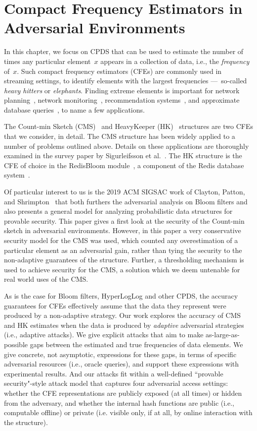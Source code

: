 \chapter{Compact Frequency Estimators in Adversarial Environments}\label{chap:cfe}

In this chapter, we focus on CPDS that can be used to estimate the number of times any particular element~$x$ appears in a collection of data, i.e., the \emph{frequency} of~$x$. Such compact frequency estimators (CFEs) are commonly used in streaming settings, to identify elements with the largest frequencies ---~so-called \emph{heavy hitters} or \emph{elephants}.  Finding extreme elements is important for network planning~\cite{feldmann00}, network monitoring~\cite{lakhina04}, recommendation systems~\cite{melis2015efficient}, and approximate database queries~\cite{redisbloom}, to name a few applications.  

The Count-min Sketch (CMS)~\cite{cormode2005improved} and HeavyKeeper (HK)~\cite{yang2019heavykeeper} structures are two CFEs that we consider, in detail.
The CMS structure has been widely applied to a number of problems outlined above. Details on these applications are thoroughly examined in the survey paper by Sigurleifsson et al.~\cite{sigurleifsson2019overview}. The HK structure is the CFE of choice in the RedisBloom module~\cite{redisbloom}, a component of the Redis database system~\cite{redis}.  

Of particular interest to us is the 2019 ACM SIGSAC work of Clayton, Patton, and Shrimpton~\cite{clayton2019} that both furthers the adversarial analysis on Bloom filters and also presents a general model for analyzing probabilistic data structures for provable security. This paper gives a first look at the security of the Count-min sketch in adversarial environments. However, in this paper a very conservative security model for the CMS was used, which counted any overestimation of a particular element as an adversarial gain, rather than tying the security to the non-adaptive guarantees of the structure. Further, a thresholding mechanism is used to achieve security for the CMS, a solution which we deem untenable for real world uses of the CMS. 

As is the case for Bloom filters, HyperLogLog and other CPDS, the accuracy guarantees for CFEs effectively assume that the data they represent were produced by a non-adaptive strategy.  Our work explores the accuracy of CMS and HK estimates when the data is produced by \emph{adaptive} adversarial strategies (i.e., adaptive attacks).  We give explicit attacks that aim to make as-large-as-possible gaps between the estimated and true frequencies of data elements.  We give concrete, not asymptotic, expressions for these gaps, in terms of specific adversarial resources (i.e., oracle queries), and support these expressions with experimental results.  And our attacks fit within a well-defined ``provable security"-style attack model that captures four adversarial access settings: whether the CFE representations are publicly exposed (at all times) or hidden from the adversary, and whether the internal hash functions are public (i.e., computable offline) or private (i.e. visible only, if at all, by online interaction with the structure).

